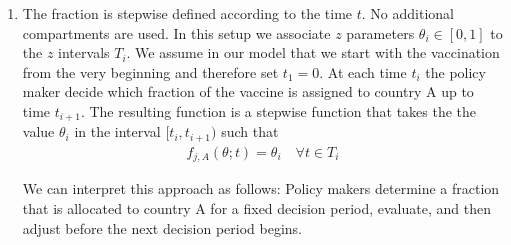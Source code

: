 \begin{enumerate}
\item The fraction is stepwise defined according to the time $t$. No additional compartments are used.
In this setup we associate $z$ parameters $\theta_i \in [0,1]$  to the $z$ intervals $T_i$. We assume in our model that we start with the vaccination from the very beginning and therefore set $t_1 = 0$. At each time $t_i$ the policy maker decide which fraction of the vaccine is assigned to country A up to time $t_{i+1}$. The resulting function is a stepwise function that takes the the value $\theta_i$ in the interval $[t_i, t_{i+1})$ such that
\begin{align*}
f_{j,A}(\theta; t) = \theta_i \quad \forall t \in  T_i
\end{align*}

We can interpret this approach as follows: Policy makers determine a fraction that is allocated to country A for a fixed decision period, evaluate, and then adjust before the next decision period begins.


\end{enumerate}
